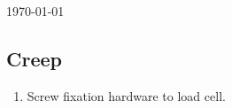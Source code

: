 \documentclass[11pt, oneside]{article}   	%
\begin{document}
\today

\subsection{Creep} %

\begin{enumerate}

\item Screw fixation hardware to load cell.



\end{enumerate}
\end{document}

